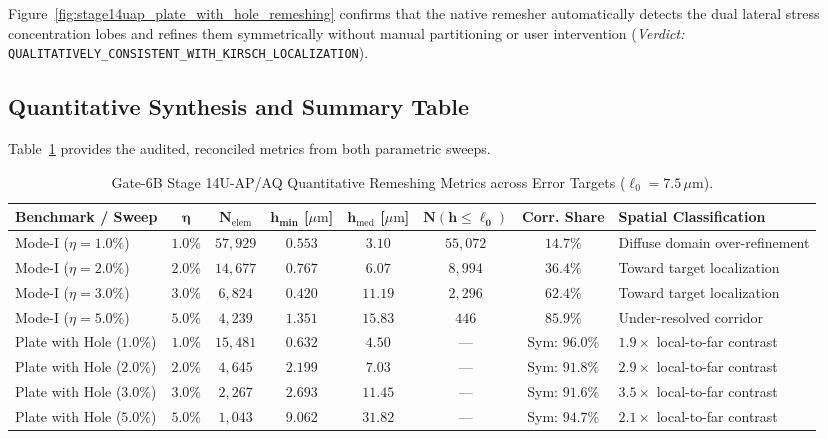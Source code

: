 Figure~\ref{fig:stage14uap_plate_with_hole_remeshing} confirms that the native remesher automatically detects the dual lateral stress concentration lobes and refines them symmetrically without manual partitioning or user intervention (\textit{Verdict:} \texttt{QUALITATIVELY\_CONSISTENT\_WITH\_KIRSCH\_LOCALIZATION}).

\subsection{Quantitative Synthesis and Summary Table}
\label{subsec:stage14uap_synthesis_table}

Table~\ref{tab:stage14uap_synthesis_summary} provides the audited, reconciled metrics from both parametric sweeps.

\begin{table}[htbp]
\centering
\scriptsize
\caption{Gate-6B Stage 14U-AP/AQ Quantitative Remeshing Metrics across Error Targets ($\ell_0 = 7.5\,\mu\mathrm{m}$).}
\label{tab:stage14uap_synthesis_summary}
\begin{tabularx}{\textwidth}{l c c c c c c >{\raggedright\arraybackslash}X}
\toprule
\textbf{Benchmark / Sweep} & $\mathbf{\eta}$ & $\mathbf{N_{\mathrm{elem}}}$ & $\mathbf{h_{\min}}$ [$\mu\mathrm{m}$] & $\mathbf{h_{\mathrm{med}}}$ [$\mu\mathrm{m}$] & $\mathbf{N(h \le \ell_0)}$ & \textbf{Corr. Share} & \textbf{Spatial Classification} \\
\midrule
Mode-I ($\eta = 1.0\%$) & $1.0\%$ & $57{,}929$ & $0.553$ & $3.10$ & $55{,}072$ & $14.7\%$ & Diffuse domain over-refinement \\
Mode-I ($\eta = 2.0\%$) & $2.0\%$ & $14{,}677$ & $0.767$ & $6.07$ & $8{,}994$  & $36.4\%$ & Toward target localization \\
Mode-I ($\eta = 3.0\%$) & $3.0\%$ & $6{,}824$  & $0.420$ & $11.19$ & $2{,}296$ & $62.4\%$ & Toward target localization \\
Mode-I ($\eta = 5.0\%$) & $5.0\%$ & $4{,}239$  & $1.351$ & $15.83$ & $446$     & $85.9\%$ & Under-resolved corridor \\
\midrule
Plate with Hole ($1.0\%$) & $1.0\%$ & $15{,}481$ & $0.632$ & $4.50$ & --- & Sym: $96.0\%$ & $1.9\times$ local-to-far contrast \\
Plate with Hole ($2.0\%$) & $2.0\%$ & $4{,}645$  & $2.199$ & $7.03$ & --- & Sym: $91.8\%$ & $2.9\times$ local-to-far contrast \\
Plate with Hole ($3.0\%$) & $3.0\%$ & $2{,}267$  & $2.693$ & $11.45$ & --- & Sym: $91.6\%$ & $3.5\times$ local-to-far contrast \\
Plate with Hole ($5.0\%$) & $5.0\%$ & $1{,}043$  & $9.062$ & $31.82$ & --- & Sym: $94.7\%$ & $2.1\times$ local-to-far contrast \\
\bottomrule
\end{tabularx}
\end{table}

